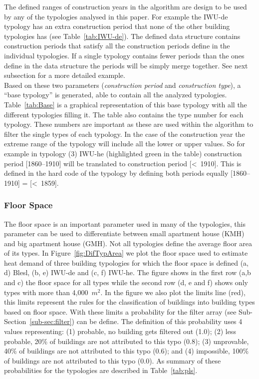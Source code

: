 The defined ranges of construction years in the algorithm are design to be used
by any of the typologies analysed in this paper.  For example the IWU-de
typology has an extra construction period that none of the other building
typologies has (see Table~\ref{tab:IWU-de}). The defined data structure
contains construction periods that satisfy all the construction periods define
in the individual typologies. If a single typology contains fewer periods than
the ones define in the data structure the periods will be simply merge
together. See next subsection for a more detailed example.\\

Based on these two parameters (\textit{construction period} and
\textit{construction type}), a ``base typology'' is generated, able to contain
all the analyzed typologies. Table~\ref{tab:Base} is a graphical
representation of this base typology with all the different typologies filling
it. The table also contains the type number for each typology. These numbers
are important as these are used within the algorithm to filter the single types
of each typology. In the case of the construction year the extreme range of
the typology will include all the lower or upper values.  So for example in
typology (3) IWU-he (highlighted green in the table) construction period
[1860--1910] will be translated to construction period [\textless~1910]. This
is defined in the hard code of the typology by defining both periods equally
[1860--1910] = [\textless~1859].\\



\subsubsection{Floor Space}\label{sub-sec:livings}

The floor space is an important parameter used in many of the typologies, this
parameter can be used to differentiate between small apartment house (KMH) and
big apartment house (GMH).  Not all typologies define the average floor area of
its types.  In Figure~\ref{fig:DifTypArea} we plot the floor space used to
estimate heat demand of three building typologies for which the floor space is
defined (a, d) Blesl, (b, e) IWU-de and (c, f) IWU-he.  The figure shows in the
first row (a,b and c) the floor space for all types while the second row (d, e
and f) shows only types with more than 4,000~$m^2$. In the figure we also plot
the limits line (red), this limits represent the rules for the classification
of buildings into building types based on floor space. With these limits a
probability for the filter array (see Sub-Section~\ref{sub-sec:filter}) can be
define.  The definition of this probability uses 4 values representing: (1)
probable, no building gets filtered out (1.0); (2) less probable, 20\% of
buildings are not attributed to this typo (0.8); (3) unprovable, 40\% of
buildings are not attributed to this typo (0.6); and (4) impossible, 100\% of
buildings are not attributed to this typo (0.0).  As summary of these
probabilities for the typologies are described in Table~\ref{tab:pls}.\\

